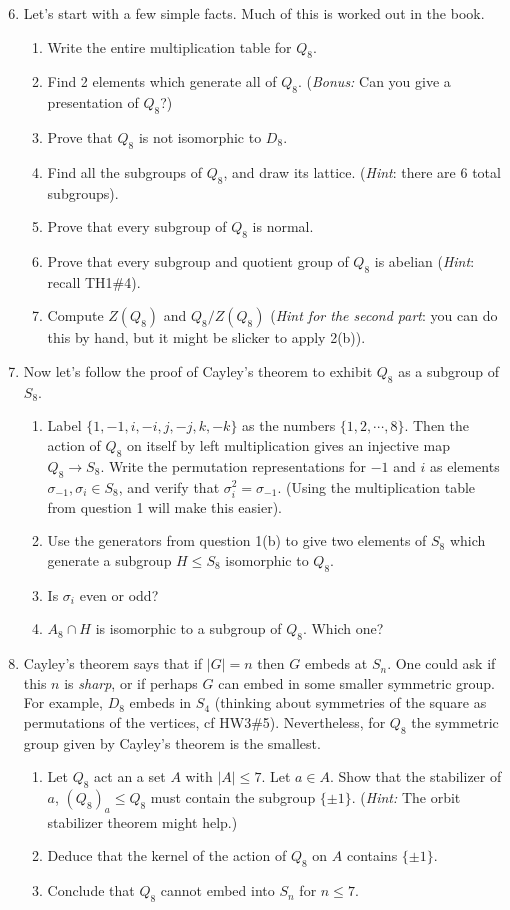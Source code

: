 \documentclass[11pt]{article}
\begin{document}
\begin{enumerate}
  \setcounter{enumi}{5}
  \item Let's start with a few simple facts.  Much of this is worked out in the book.
  \begin{enumerate}
    \item Write the entire multiplication table for $Q_8$.
    \item Find 2 elements which generate all of $Q_8$.  (\textit{Bonus:} Can you give a presentation of $Q_8$?)
    \item Prove that $Q_8$ is not isomorphic to $D_8$.
    \item Find all the subgroups of $Q_8$, and draw its lattice.  (\textit{Hint}: there are 6 total subgroups).
    \item Prove that every subgroup of $Q_8$ is normal.
    \item Prove that every subgroup and quotient group of $Q_8$ is abelian (\textit{Hint}: recall TH1\#4).
    \item Compute $Z(Q_8)$ and $Q_8/Z(Q_8)$ (\textit{Hint for the second part}: you can do this by hand, but it might be slicker to apply 2(b)).
  \end{enumerate}
  \item Now let's follow the proof of Cayley's theorem to exhibit $Q_8$ as a subgroup of $S_8$.
  \begin{enumerate}
    \item Label $\{1,-1,i,-i,j,-j,k,-k\}$ as the numbers $\{1,2,\cdots,8\}$. Then the action of $Q_8$ on itself by left multiplication gives an injective map $Q_8\to S_8$.  Write the permutation representations for $-1$ and $i$ as elements $\sigma_{-1},\sigma_i\in S_8$, and verify that $\sigma_i^2 = \sigma_{-1}$.  (Using the multiplication table from question 1 will make this easier).
    \item Use the generators from question 1(b) to give two elements of $S_8$ which generate a subgroup $H\le S_8$ isomorphic to $Q_8$.
    \item Is $\sigma_i$ even or odd?
    \item $A_8\cap H$ is isomorphic to a subgroup of $Q_8$.  Which one?
  \end{enumerate}
  \item Cayley's theorem says that if $|G|=n$ then $G$ embeds at $S_n$.  One could ask if this $n$ is \textit{sharp}, or if perhaps $G$ can embed in some smaller symmetric group.  For example, $D_8$ embeds in $S_4$ (thinking about symmetries of the square as permutations of the vertices, cf HW3\#5).  Nevertheless, for $Q_8$ the symmetric group given by Cayley's theorem is the smallest.
  \begin{enumerate}
    \item Let $Q_8$ act an a set $A$ with $|A|\le 7$.  Let $a\in A$.  Show that the stabilizer of $a$,  $(Q_8)_a\le Q_8$ must contain the subgroup $\{\pm1\}$.  (\textit{Hint:} The orbit stabilizer theorem might help.)
    \item Deduce that the kernel of the action of $Q_8$ on $A$ contains $\{\pm1\}$.
    \item Conclude that $Q_8$ cannot embed into $S_n$ for $n\le7$.
  \end{enumerate}
\end{enumerate}
\end{document}

